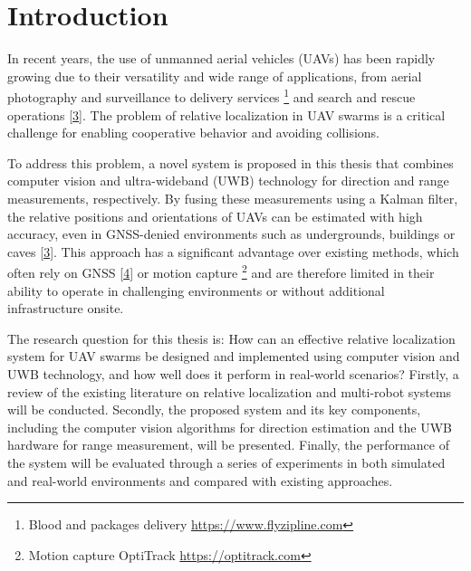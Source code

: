 \documentclass[twoside]{ctustyle/ctuthesis}
\theoremstyle{plain}
\theoremstyle{definition}
\theoremstyle{note}
\begin{document}
\maketitle


\hypertarget{introduction}{%
\chapter{Introduction}\label{introduction}}

In recent years, the use of unmanned aerial vehicles (UAVs) has been
rapidly growing due to their versatility and wide range of applications,
from aerial photography and surveillance to delivery services
\footnote{Blood and packages delivery \url{https://www.flyzipline.com}}
and search and rescue operations
{[}\protect\hyperlink{ref-petrlik2023uavs}{3}{]}. The problem of
relative localization in UAV swarms is a critical challenge for enabling
cooperative behavior and avoiding collisions.

To address this problem, a novel system is proposed in this thesis that
combines computer vision and ultra-wideband (UWB) technology for
direction and range measurements, respectively. By fusing these
measurements using a Kalman filter, the relative positions and
orientations of UAVs can be estimated with high accuracy, even in
GNSS-denied environments such as undergrounds, buildings or caves
{[}\protect\hyperlink{ref-petrlik2023uavs}{3}{]}. This approach has a
significant advantage over existing methods, which often rely on GNSS
{[}\protect\hyperlink{ref-6943105}{4}{]} or motion capture \footnote{Motion
  capture OptiTrack \url{https://optitrack.com}} and are therefore
limited in their ability to operate in challenging environments or
without additional infrastructure onsite.

The research question for this thesis is: How can an effective relative
localization system for UAV swarms be designed and implemented using
computer vision and UWB technology, and how well does it perform in
real-world scenarios? Firstly, a review of the existing literature on
relative localization and multi-robot systems will be conducted.
Secondly, the proposed system and its key components, including the
computer vision algorithms for direction estimation and the UWB hardware
for range measurement, will be presented. Finally, the performance of
the system will be evaluated through a series of experiments in both
simulated and real-world environments and compared with existing
approaches.
\end{document}
